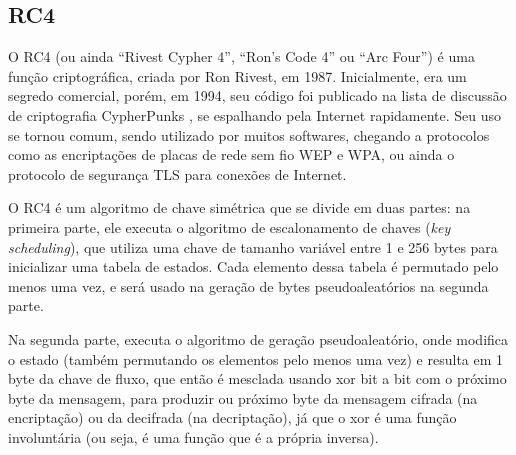 
\subsection*{RC4}

O RC4 (ou ainda ``Rivest Cypher 4'', ``Ron's Code 4'' ou ``Arc Four'') é uma função
criptográfica, criada por Ron Rivest, em 1987. Inicialmente, era um segredo comercial,
porém, em 1994, seu código foi publicado na lista de discussão de criptografia
CypherPunks \cite{site:rc4-code}, se espalhando pela Internet rapidamente. Seu uso se
tornou comum, sendo utilizado por muitos softwares, chegando a protocolos como as
encriptações de placas de rede sem fio WEP e WPA, ou ainda o protocolo de segurança TLS
para conexões de Internet.

O RC4 é um algoritmo de chave simétrica que se divide em duas partes: na primeira
parte, ele executa o algoritmo de escalonamento de chaves (\emph{key scheduling}),
que utiliza uma chave de tamanho variável entre 1 e 256 bytes para inicializar uma
tabela de estados. Cada elemento dessa tabela é permutado pelo menos uma vez, e será
usado na geração de bytes pseudoaleatórios na segunda parte.

\newpage
Na segunda parte, executa o algoritmo de geração pseudoaleatório, onde modifica o estado
(também permutando os elementos pelo menos uma vez) e resulta em 1 byte da chave de
fluxo, que então é mesclada usando \gls{xor} bit a bit com o próximo byte da mensagem,
para produzir ou próximo byte da mensagem cifrada (na encriptação) ou da decifrada (na
decriptação), já que o \gls*{xor} é uma função involuntária (ou seja, é uma função que
é a própria inversa).



